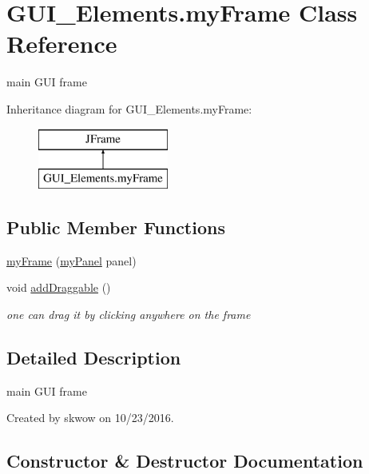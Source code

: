 \hypertarget{class_g_u_i___elements_1_1my_frame}{}\section{G\+U\+I\+\_\+\+Elements.\+my\+Frame Class Reference}
\label{class_g_u_i___elements_1_1my_frame}


main G\+UI frame  


Inheritance diagram for G\+U\+I\+\_\+\+Elements.\+my\+Frame\+:\begin{figure}[H]
\begin{center}
\leavevmode
\includegraphics[height=2.000000cm]{class_g_u_i___elements_1_1my_frame}
\end{center}
\end{figure}
\subsection*{Public Member Functions}
\begin{DoxyCompactItemize}
\item 
\hyperlink{class_g_u_i___elements_1_1my_frame_aa440e02a2f616477910624372b55f2fb}{my\+Frame} (\hyperlink{class_g_u_i___elements_1_1my_panel}{my\+Panel} panel)
\item 
void \hyperlink{class_g_u_i___elements_1_1my_frame_a5f5da5b4e114c7aff38f3b4b361bf483}{add\+Draggable} ()
\begin{DoxyCompactList}\small\item\em one can drag it by clicking anywhere on the frame \end{DoxyCompactList}\end{DoxyCompactItemize}


\subsection{Detailed Description}
main G\+UI frame 

Created by skwow on 10/23/2016. 

\subsection{Constructor \& Destructor Documentation}
\hypertarget{class_g_u_i___elements_1_1my_frame_aa440e02a2f616477910624372b55f2fb}{}\label{class_g_u_i___elements_1_1my_frame_aa440e02a2f616477910624372b55f2fb} 
